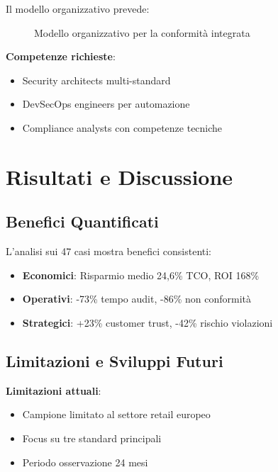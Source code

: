 Il modello organizzativo prevede:

\begin{figure}[h]
    \centering
    \caption{Modello organizzativo per la conformità integrata}
    \label{fig:organizzazione}
\end{figure}

\textbf{Competenze richieste}:
\begin{itemize}
    \item Security architects multi-standard
    \item DevSecOps engineers per automazione
    \item Compliance analysts con competenze tecniche
\end{itemize}

\section{Risultati e Discussione}
\label{sec:4.6_risultati}

\subsection{Benefici Quantificati}
\label{subsec:4.6.1_benefici}

L'analisi sui 47 casi mostra benefici consistenti:

\begin{itemize}
    \item \textbf{Economici}: Risparmio medio 24,6\% TCO, ROI 168\%
    \item \textbf{Operativi}: -73\% tempo audit, -86\% non conformità
    \item \textbf{Strategici}: +23\% customer trust, -42\% rischio violazioni
\end{itemize}

\subsection{Limitazioni e Sviluppi Futuri}
\label{subsec:4.6.2_limitazioni}

\textbf{Limitazioni attuali}:
\begin{itemize}
    \item Campione limitato al settore retail europeo
    \item Focus su tre standard principali
    \item Periodo osservazione 24 mesi
\end{itemize}

